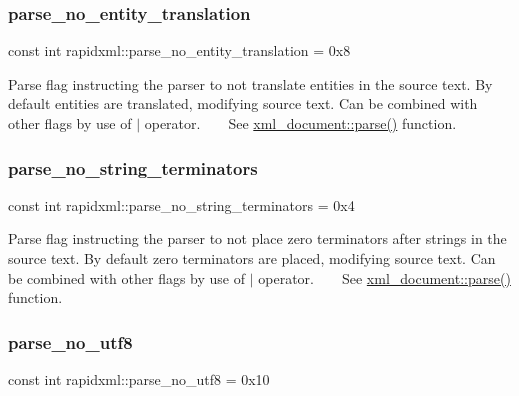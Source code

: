 \subsubsection{\texorpdfstring{parse\+\_\+no\+\_\+entity\+\_\+translation}{parse\_no\_entity\_translation}}
{\footnotesize\ttfamily const int rapidxml\+::parse\+\_\+no\+\_\+entity\+\_\+translation = 0x8}

Parse flag instructing the parser to not translate entities in the source text. By default entities are translated, modifying source text. Can be combined with other flags by use of $\vert$ operator. ~\newline
~\newline
 See \mbox{\hyperlink{classrapidxml_1_1xml__document_ac6e73ff9ac323bf5a370c38feb03a6b1}{xml\+\_\+document\+::parse()}} function. \mbox{\label{namespacerapidxml_af3fc88ba6bee33482a2db81b1da36ea1}} 
\subsubsection{\texorpdfstring{parse\+\_\+no\+\_\+string\+\_\+terminators}{parse\_no\_string\_terminators}}
{\footnotesize\ttfamily const int rapidxml\+::parse\+\_\+no\+\_\+string\+\_\+terminators = 0x4}

Parse flag instructing the parser to not place zero terminators after strings in the source text. By default zero terminators are placed, modifying source text. Can be combined with other flags by use of $\vert$ operator. ~\newline
~\newline
 See \mbox{\hyperlink{classrapidxml_1_1xml__document_ac6e73ff9ac323bf5a370c38feb03a6b1}{xml\+\_\+document\+::parse()}} function. \mbox{\label{namespacerapidxml_a22d4aefaceb00d7afabfef7107b108da}} 
\subsubsection{\texorpdfstring{parse\+\_\+no\+\_\+utf8}{parse\_no\_utf8}}
{\footnotesize\ttfamily const int rapidxml\+::parse\+\_\+no\+\_\+utf8 = 0x10}

